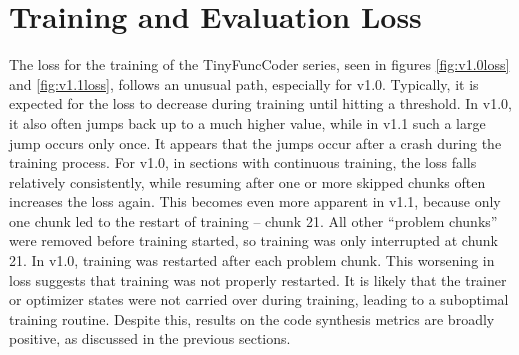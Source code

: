 \section{Training and Evaluation Loss}
\label{sec:loss}

The loss for the training of the TinyFuncCoder series, seen in figures \ref{fig:v1.0loss} and \ref{fig:v1.1loss}, follows an unusual path, especially for v1.0.
Typically, it is expected for the loss to decrease during training until hitting a threshold.
In v1.0, it also often jumps back up to a much higher value, while in v1.1 such a large jump occurs only once.
It appears that the jumps occur after a crash during the training process.
For v1.0, in sections with continuous training, the loss falls relatively consistently, while resuming after one or more skipped chunks often increases the loss again.
This becomes even more apparent in v1.1, because only one chunk led to the restart of training -- chunk 21.
All other \enquote{problem chunks} were removed before training started, so training was only interrupted at chunk 21.
In v1.0, training was restarted after each problem chunk.
This worsening in loss suggests that training was not properly restarted.
It is likely that the trainer or optimizer states were not carried over during training, leading to a suboptimal training routine.
Despite this, results on the code synthesis metrics are broadly positive, as discussed in the previous sections.

